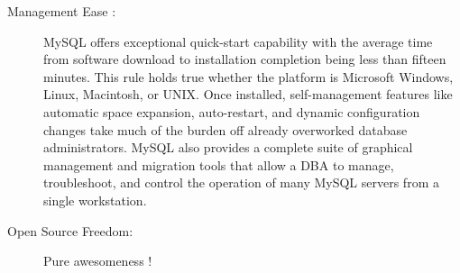 \begin{description}
\item[Management Ease :]
MySQL offers exceptional quick-start capability with the average time from software download to installation completion being less than fifteen minutes. This rule holds true whether the platform is Microsoft Windows, Linux, Macintosh, or UNIX. Once installed, self-management features like automatic space expansion, auto-restart, and dynamic configuration changes take much of the burden off already overworked database administrators. MySQL also provides a complete suite of graphical management and migration tools that allow a DBA to manage, troubleshoot, and control the operation of many MySQL servers from a single workstation. 

\item[Open Source Freedom:]
Pure awesomeness !
\end{description}

